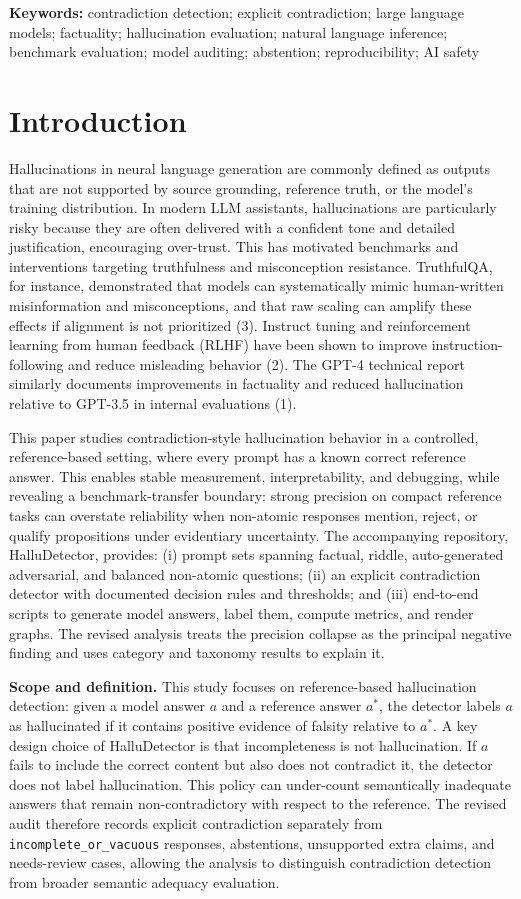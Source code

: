 \documentclass[11pt]{article}
\newcommand{\code}[1]{\texttt{#1}}
\begin{document}
\textbf{Keywords:} contradiction detection; explicit contradiction; large language models; factuality; hallucination evaluation; natural language inference; benchmark evaluation; model auditing; abstention; reproducibility; AI safety

\section*{Introduction}
Hallucinations in neural language generation are commonly defined as outputs that are not supported by source grounding, reference truth, or the model's training distribution. In modern LLM assistants, hallucinations are particularly risky because they are often delivered with a confident tone and detailed justification, encouraging over-trust. This has motivated benchmarks and interventions targeting truthfulness and misconception resistance. TruthfulQA, for instance, demonstrated that models can systematically mimic human-written misinformation and misconceptions, and that raw scaling can amplify these effects if alignment is not prioritized (3). Instruct tuning and reinforcement learning from human feedback (RLHF) have been shown to improve instruction-following and reduce misleading behavior (2). The GPT-4 technical report similarly documents improvements in factuality and reduced hallucination relative to GPT-3.5 in internal evaluations (1).

This paper studies contradiction-style hallucination behavior in a controlled, reference-based setting, where every prompt has a known correct reference answer. This enables stable measurement, interpretability, and debugging, while revealing a benchmark-transfer boundary: strong precision on compact reference tasks can overstate reliability when non-atomic responses mention, reject, or qualify propositions under evidentiary uncertainty. The accompanying repository, HalluDetector, provides: (i) prompt sets spanning factual, riddle, auto-generated adversarial, and balanced non-atomic questions; (ii) an explicit contradiction detector with documented decision rules and thresholds; and (iii) end-to-end scripts to generate model answers, label them, compute metrics, and render graphs. The revised analysis treats the precision collapse as the principal negative finding and uses category and taxonomy results to explain it.

\textbf{Scope and definition.} This study focuses on reference-based hallucination detection: given a model answer $a$ and a reference answer $a^*$, the detector labels $a$ as hallucinated if it contains positive evidence of falsity relative to $a^*$. A key design choice of HalluDetector is that incompleteness is not hallucination. If $a$ fails to include the correct content but also does not contradict it, the detector does not label hallucination. This policy can under-count semantically inadequate answers that remain non-contradictory with respect to the reference. The revised audit therefore records explicit contradiction separately from \code{incomplete\_or\_vacuous} responses, abstentions, unsupported extra claims, and needs-review cases, allowing the analysis to distinguish contradiction detection from broader semantic adequacy evaluation.
\end{document}
